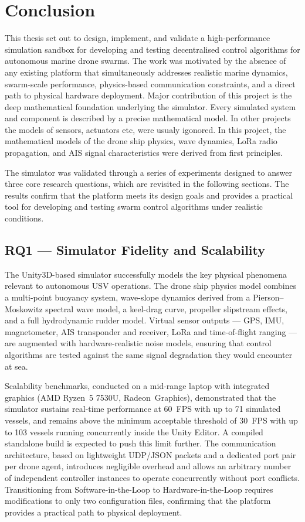 \section{Conclusion}
\label{sec:conclusion}

This thesis set out to design, implement, and validate a high-performance
simulation sandbox for developing and testing decentralised control algorithms
for autonomous marine drone swarms. The work was motivated by the absence
of any existing platform that simultaneously addresses realistic marine
dynamics, swarm-scale performance, physics-based communication constraints,
and a direct path to physical hardware deployment. Major contribution of this project
is the deep mathematical foundation underlying the simulator. Every simulated system and component is described by a precise mathematical model. In other projects the models of sensors, actuators etc, were usualy igonored. In this project, the mathematical models of the drone ship physics, wave dynamics, LoRa radio propagation, and AIS signal characteristics were derived from first principles.

The simulator was validated through a series of experiments designed to answer three core research questions, which are revisited in the following sections. The results confirm that the platform meets its design goals and provides a practical tool for developing and testing swarm control algorithms under realistic conditions.


\subsection*{RQ1 — Simulator Fidelity and Scalability}

The Unity3D-based simulator successfully models the key physical phenomena
relevant to autonomous USV operations. The drone ship physics model
combines a multi-point buoyancy system, wave-slope dynamics derived from a
Pierson–Moskowitz spectral wave model, a keel-drag curve, propeller slipstream
effects, and a full hydrodynamic rudder model. Virtual sensor outputs — GPS,
IMU, magnetometer, AIS transponder and receiver, LoRa and time-of-flight
ranging — are augmented with hardware-realistic noise models, ensuring that
control algorithms are tested against the same signal degradation they would
encounter at sea.

Scalability benchmarks, conducted on a mid-range laptop with integrated
graphics (AMD Ryzen\texttrademark~5 7530U, Radeon\texttrademark~Graphics),
demonstrated that the simulator sustains real-time performance at 60~FPS with
up to 71 simulated vessels, and remains above the minimum acceptable
threshold of 30~FPS with up to 103 vessels running concurrently inside the
Unity Editor. A compiled standalone build is expected to push this limit
further. The communication architecture, based on lightweight UDP/JSON
packets and a dedicated port pair per drone agent, introduces negligible
overhead and allows an arbitrary number of independent controller instances to
operate concurrently without port conflicts. Transitioning from
Software-in-the-Loop to Hardware-in-the-Loop requires modifications to only
two configuration files, confirming that the platform provides a practical path
to physical deployment.

